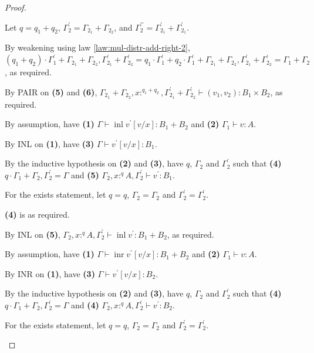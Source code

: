 \documentclass[acmsmall,screen,nonacm]{acmart}
\DeclareMathOperator{\inl}{\text{inl}}
\DeclareMathOperator{\inr}{\text{inr}}
\newcommand{\tee}{\vdash}
\begin{document}
\begin{proof}
\begin{description}
    Let $q = q_1 + q_2$, $\Gamma_2^\prime = \Gamma_{2_1} + \Gamma_{2_2}$, and $\Gamma_2^{\prime\prime} = \Gamma_{2_1}^\prime + \Gamma_{2_1}^\prime$.

    By weakening using law \ref{law:mul-distr-add-right-2}, $(q_1 + q_2) \cdot \Gamma_1^\prime + \Gamma_{2_1} + \Gamma_{2_2}, \Gamma_{2_1}^\prime + \Gamma_{2_2}^\prime = q_1 \cdot \Gamma_1^\prime + q_2 \cdot \Gamma_1^\prime + \Gamma_{2_1} + \Gamma_{2_2}, \Gamma_{2_1}^\prime + \Gamma_{2_2}^\prime = \Gamma_1 + \Gamma_2$, as required.

    By PAIR on \textbf{(5)} and \textbf{(6)}, $\Gamma_{2_1} + \Gamma_{2_2}, x :^{q_1 + q_2}, \Gamma_{2_1}^\prime + \Gamma_{2_2}^\prime \tee (v_1, v_2) : B_1 \times B_2$, as required.
    \\
    \item[Case INL.]
    By assumption, have \textbf{(1)} $\Gamma \tee \inl v^\prime[v/x] : B_1 + B_2$ and \textbf{(2)} $\Gamma_1 \tee v : A$.
    
    By INL on \textbf{(1)}, have \textbf{(3)} $\Gamma \tee v^\prime[v/x] : B_1$.

    By the inductive hypothesis on \textbf{(2)} and \textbf{(3)}, have $q$, $\Gamma_2$ and $\Gamma_2^\prime$ such that \textbf{(4)} $q \cdot \Gamma_1 + \Gamma_2, \Gamma_2^\prime = \Gamma$ and \textbf{(5)} $\Gamma_2, x :^q A, \Gamma_2^\prime \tee v^\prime : B_1$.
    
    For the exists statement, let $q = q$, $\Gamma_2 = \Gamma_2$ and $\Gamma_2^\prime = \Gamma_2^\prime$.

    \textbf{(4)} is as required.

    By INL on \textbf{(5)}, $\Gamma_2, x :^q A, \Gamma_2^\prime \tee \inl v^\prime : B_1 + B_2$, as required.
    \\
    \item[Case INR.] 
    By assumption, have \textbf{(1)} $\Gamma \tee \inr v^\prime[v/x] : B_1 + B_2$ and \textbf{(2)} $\Gamma_1 \tee v : A$.

    By INR on \textbf{(1)}, have \textbf{(3)} $\Gamma \tee v^\prime[v/x] : B_2$.

    By the inductive hypothesis on \textbf{(2)} and \textbf{(3)}, have $q$, $\Gamma_2$ and $\Gamma_2^\prime$ such that \textbf{(4)} $q \cdot \Gamma_1 + \Gamma_2, \Gamma_2^\prime = \Gamma$ and \textbf{(4)} $\Gamma_2, x :^q A, \Gamma_2^\prime \tee v^\prime : B_2$.
    
    For the exists statement, let $q = q$, $\Gamma_2 = \Gamma_2$ and $\Gamma_2^\prime = \Gamma_2^\prime$.


\end{description}
\end{proof}
\end{document}
